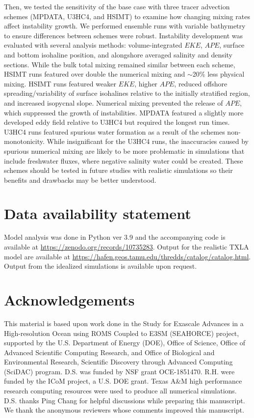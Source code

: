 Then, we tested the sensitivity of the base case with three tracer advection schemes (MPDATA, U3HC4, and HSIMT) to examine how changing mixing rates affect instability growth. We performed ensemble runs with variable bathymetry to ensure differences between schemes were robust. Instability development was evaluated with several analysis methods: volume-integrated $EKE$, $APE$, surface and bottom isohaline position, and alongshore averaged salinity and density sections. While the bulk total mixing remained similar between each scheme, HSIMT runs featured over double the numerical mixing and $\sim$20\% less physical mixing. HSIMT runs featured weaker $EKE$, higher $APE$, reduced offshore spreading/variability of surface isohalines relative to the initially stratified region, and increased isopycnal slope. Numerical mixing prevented the release of $APE$, which suppressed the growth of instabilities. MPDATA featured a slightly more developed eddy field relative to U3HC4 but required the longest run times. U3HC4 runs featured spurious water formation as a result of the schemes non-monotonicity. While insignificant for the U3HC4 runs, the inaccuracies caused by spurious numerical mixing are likely to be more problematic in simulations that include freshwater fluxes, where negative salinity water could be created. These schemes should be tested in future studies with realistic simulations so their benefits and drawbacks may be better understood. 

\section{Data availability statement}
Model analysis was done in Python ver 3.9 and the accompanying code is available at \url{https://zenodo.org/records/10735283}. Output for the realistic TXLA model are available at \url{https://hafen.geos.tamu.edu/thredds/catalog/catalog.html}. Output from the idealized simulations is available upon request.

\section{Acknowledgements}
This material is based upon work done in the Study for Exascale Advances in a High-resolution Ocean using ROMS Coupled to E3SM (SEAHORCE) project, supported by the U.S. Department of Energy (DOE), Office of Science, Office of Advanced Scientific Computing Research, and Office of Biological and Environmental Research, Scientific Discovery through Advanced Computing (SciDAC) program. D.S. was funded by NSF grant OCE-1851470. R.H. were funded by the ICoM project, a U.S. DOE grant. Texas A\&M high performance research computing resources were used to produce all numerical simulations. D.S. thanks Ping Chang for helpful discussions while preparing this manuscript. We thank the anonymous reviewers whose comments improved this manuscript. 

